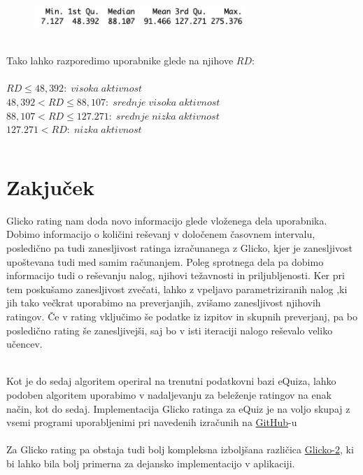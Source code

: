 \documentclass{IEEEtran}
\begin{document}
\begin{figure}[h!]
    \includegraphics[width=8cm]{RDstat}
    \label{fig:example}%
\end{figure}

\hfill
\\
Tako lahko razporedimo uporabnike glede na njihove $RD$:
\hfill
\\
\\
$RD\leq48,392:\;visoka\;aktivnost$
\hfill
\\
$48,392<RD\leq88,107:\;srednje\;visoka\;aktivnost$
\hfill
\\
$88,107<RD\leq127.271:\;srednje\;nizka\;aktivnost$
\hfill
\\
$127.271<RD:\;nizka\;aktivnost$
\hfill




\lstset{basicstyle=\tiny,style=SQLstyle}
\begin{lstlisting}
\end{lstlisting}

\section{Zakjuček}
\label{sec:cnc}

Glicko rating nam doda novo informacijo glede vloženega dela uporabnika. Dobimo informacijo o količini reševanj v določenem časovnem intervalu, posledično pa tudi zanesljivost ratinga izračunanega z Glicko, kjer je zanesljivost upoštevana tudi med samim računanjem. Poleg sprotnega dela pa dobimo informacijo tudi o reševanju nalog, njihovi težavnosti in priljubljenosti. Ker pri tem poskušamo zanesljivost zvečati, lahko z vpeljavo parametriziranih nalog
,ki jih tako večkrat uporabimo na preverjanjih, zvišamo zanesljivost njihovih ratingov. Če v rating vključimo še podatke iz izpitov in skupnih preverjanj, pa bo posledično rating še zanesljivejši, saj bo v isti iteraciji nalogo reševalo veliko učencev.

\hfill
\\
Kot je do sedaj algoritem operiral na trenutni podatkovni bazi eQuiza, lahko podoben algoritem uporabimo v nadaljevanju za beleženje ratingov na enak način, kot do sedaj. Implementacija Glicko ratinga za eQuiz je na voljo skupaj z vsemi programi uporabljenimi pri navedenih izračunih na \href{https://github.com/MAZI2/Glicko_eQuiz}{GitHub}-u 
\hfill
\\
\\
Za Glicko rating pa obstaja tudi bolj kompleksna izboljšana različica \href{http://www.glicko.net/glicko/glicko2.pdf}{Glicko-2}, ki bi lahko bila bolj primerna za dejansko implementacijo v aplikaciji.



\end{document}
